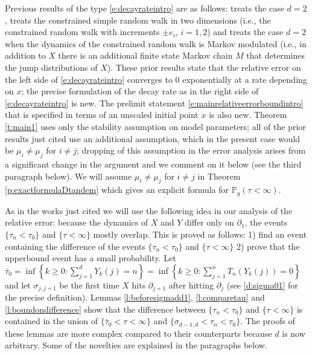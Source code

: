 \documentclass[11pt,a4paper]{article}
\begin{document}
Previous results of the type \eqref{e:decayrateintro} are as follows:
\cite[Proposition 8]{sezer2018approximation} treats the  case $d=2$, 
\cite[Theorem 6.1]{unlu2019excessive}
treats the constrained simple random walk in two dimensions
(i.e., the constrained random walk with increments $\pm e_i$, $i=1,2$)
and \cite[Theorem 6.1]{kabran2020approximation} treats 
the case $d=2$ when the dynamics of the constrained random walk
is Markov modulated (i.e., in addition to $X$ there is an additional finite
state Markov chain $M$ that determines the jump distributions of $X$).
These prior results state that the relative error on the left
side of \eqref{e:decayrateintro} converges to $0$ exponentially at a rate
depending on $x$; the precise formulation of the decay rate as in the
right side of \eqref{e:decayrateintro} is new. 
The prelimit statement \eqref{e:mainrelativeerrorboundintro} that is specified
in terms of an unscaled initial point $x$ is also new.
Theorem \ref{t:main1} uses only the stability assumption on model parameters;
all of the prior results just cited use an additional assumption, which
in the present case would be $\mu_i \neq \mu_j$ for $i \neq j$; 
dropping of this assumption in the error analysis arises from a 
significant change in the argument and we comment on it below
(see the third paragraph below).
We will assume $\mu_i \neq \mu_j$ for $i \neq j$ in Theorem \ref{p:exactformulaDtandem}
which gives an explicit formula for ${\mathbb P}_y(\tau < \infty).$

As in the works just cited we will use the following idea in our
analysis of the relative error:
because the dynamics of $X$ and $Y$ differ only on 
$\partial_1$, 
the events $\{\tau_n < \tau_0\}$ and $\{\tau < \infty\}$
mostly overlap. This is proved as follows: 1) find an event
containing the difference of the events
 $\{\tau_n < \tau_0\}$ and $\{\tau < \infty\}$ 2) prove that the
upperbound event has a small probability. 
Let $\bar\tau_0 =  \inf\left\{k \ge 0: \sum_{j=1}^d Y_k(j) = n\right\} = \inf\left\{k \ge 0: \sum_{j=1}^n T_n(Y_k(j)) = 0 \right\}$ and
let $\sigma_{j,j+1}$ be the first time $X$ hits $\partial_{j+1}$ after hitting
$\partial_j$ (see \eqref{d:sigma01} for the precise definition).
Lemmas \ref{l:beforesigmadd1}, \ref{l:comparetau} and \ref{l:boundondifference}
show that the difference between 
$\{\tau_n < \tau_0\}$ and $\{\tau < \infty\}$
is contained in the
union of $\{\bar\tau_0 < \tau < \infty\}$ and 
$\{\sigma_{d-1,d} < \tau_n < \tau_0\}$.
The proofs of these lemmas 
are more complex compared to their counterparts 
\cite{sezer2018approximation,kabran2020approximation} because $d$ is
now  arbitrary.
Some of the novelties are explained in the paragraphs below.
\end{document}
